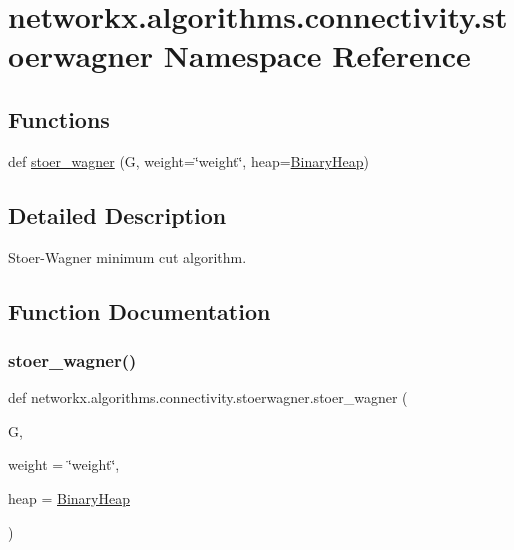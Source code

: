 \hypertarget{namespacenetworkx_1_1algorithms_1_1connectivity_1_1stoerwagner}{}\section{networkx.\+algorithms.\+connectivity.\+stoerwagner Namespace Reference}
\label{namespacenetworkx_1_1algorithms_1_1connectivity_1_1stoerwagner}
\subsection*{Functions}
\begin{DoxyCompactItemize}
\item 
def \hyperlink{namespacenetworkx_1_1algorithms_1_1connectivity_1_1stoerwagner_ac52a4138bced25f24a5d1cd7835b0a46}{stoer\+\_\+wagner} (G, weight=\char`\"{}weight\char`\"{}, heap=\hyperlink{classnetworkx_1_1utils_1_1heaps_1_1BinaryHeap}{Binary\+Heap})
\end{DoxyCompactItemize}


\subsection{Detailed Description}
\begin{DoxyVerb}Stoer-Wagner minimum cut algorithm.
\end{DoxyVerb}
 

\subsection{Function Documentation}
\mbox{\label{namespacenetworkx_1_1algorithms_1_1connectivity_1_1stoerwagner_ac52a4138bced25f24a5d1cd7835b0a46}} 
\subsubsection{\texorpdfstring{stoer\+\_\+wagner()}{stoer\_wagner()}}
{\footnotesize\ttfamily def networkx.\+algorithms.\+connectivity.\+stoerwagner.\+stoer\+\_\+wagner (\begin{DoxyParamCaption}\item[{}]{G,  }\item[{}]{weight = {\ttfamily \char`\"{}weight\char`\"{}},  }\item[{}]{heap = {\ttfamily \hyperlink{classnetworkx_1_1utils_1_1heaps_1_1BinaryHeap}{Binary\+Heap}} }\end{DoxyParamCaption})}

